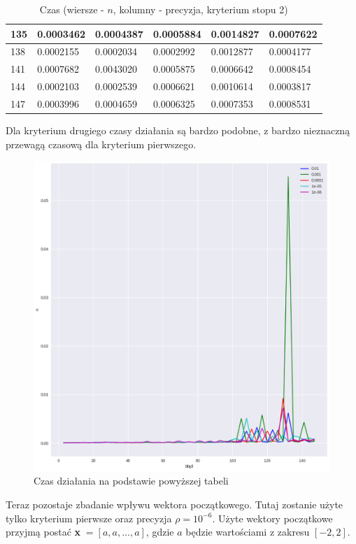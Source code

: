 \documentclass{article}
\begin{document}
\begin{table}[H]
\begin{tabular}{|l|l|l|l|l|l|}
135 & 0.0003462 & 0.0004387 & 0.0005884 & 0.0014827 & 0.0007622 \\ \hline
138 & 0.0002155 & 0.0002034 & 0.0002992 & 0.0012877 & 0.0004177 \\ \hline
141 & 0.0007682 & 0.0043020 & 0.0005875 & 0.0006642 & 0.0008454 \\ \hline
144 & 0.0002103 & 0.0002539 & 0.0006621 & 0.0010614 & 0.0003817 \\ \hline
147 & 0.0003996 & 0.0004659 & 0.0006325 & 0.0007353 & 0.0008531 \\ \hline
\end{tabular}
\caption{Czas (wiersze - $n$, kolumny - precyzja, kryterium stopu 2)}
\end{table}

Dla kryterium drugiego czasy działania są bardzo podobne, z bardzo nieznaczną przewagą czasową dla kryterium pierwszego.

\begin{figure}[H]
    \centering
    \includegraphics[width=\textwidth]{img/plot_6.png}
    \caption{Czas działania na podstawie powyższej tabeli}
\end{figure}

Teraz pozostaje zbadanie wpływu wektora początkowego. Tutaj zostanie użyte tylko kryterium pierwsze oraz precyzja $\rho=10^{-6}$. Użyte wektory
początkowe przyjmą postać \textbf{x}$\;=[a,a,...,a]$, gdzie $a$ będzie wartościami z zakresu $[-2,2]$.
\end{document}
